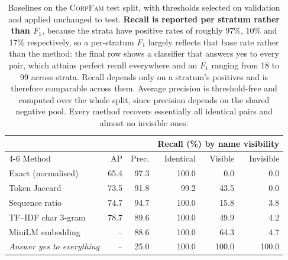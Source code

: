 \begin{table}[t]
\centering
\small
\begin{tabular}{lrrrrr}
\toprule
& & & \multicolumn{3}{c}{Recall (\%) by name visibility} \\
\cmidrule(lr){4-6}
Method & AP & Prec. & Identical & Visible & Invisible \\
\midrule
Exact (normalised) & 65.4 & 97.3 & 100.0 & 0.0 & 0.0 \\
Token Jaccard & 73.5 & 91.8 & 99.2 & 43.5 & 0.0 \\
Sequence ratio & 74.7 & 94.7 & 100.0 & 15.8 & 3.8 \\
TF--IDF char 3-gram & 78.7 & 89.6 & 100.0 & 49.9 & 4.2 \\
\midrule
MiniLM embedding & -- & 88.6 & 100.0 & 64.3 & 4.7 \\
\midrule
\emph{Answer yes to everything} & -- & 25.0 & 100.0 & 100.0 & 100.0 \\
\bottomrule
\end{tabular}
\caption{Baselines on the \textsc{CorpFam} test split, with thresholds selected on
validation and applied unchanged to test. \textbf{Recall is reported per stratum
rather than $F_1$}, because the strata have positive rates of roughly 97\%, 10\% and
17\% respectively, so a per-stratum $F_1$ largely reflects that base rate rather than
the method: the final row shows a classifier that answers yes to every pair, which
attains perfect recall everywhere and an $F_1$ ranging from 18 to 99 across strata.
Recall depends only on a stratum's positives and is therefore comparable across them.
Average precision is threshold-free and computed over the whole split, since precision
depends on the shared negative pool. Every method recovers essentially all identical
pairs and almost no invisible ones.}
\label{tab:baselines}
\end{table}
